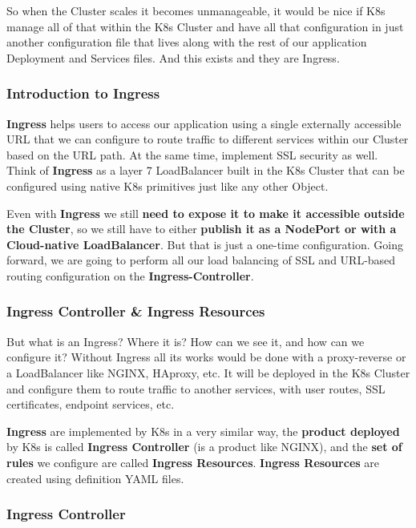\documentclass{article}
\begin{document}
So when the Cluster scales it becomes unmanageable, it would be nice if K8s manage all of that within the K8s Cluster and have all that configuration in just another configuration file that lives along with the rest  of our application Deployment and Services files. And this exists and they are Ingress.

\subsubsection{Introduction to Ingress}

\textbf{Ingress} helps users to access our application using a single externally accessible URL that we can configure to route traffic to different services within our Cluster based on the URL path. At the same time, implement SSL security as well. Think of \textbf{Ingress} as a layer 7 LoadBalancer built in the K8s Cluster that can be configured using native K8s primitives just like any other Object.

Even with \textbf{Ingress} we still \textbf{need to expose it to make it accessible outside the Cluster}, so we still have to either \textbf{publish it as a NodePort or with a Cloud-native LoadBalancer}. But that is just a one-time configuration. Going forward, we are going to perform all our load balancing of SSL and URL-based routing configuration on the \textbf{Ingress-Controller}.

\subsubsection{Ingress Controller \& Ingress Resources}

But what is an Ingress? Where it is? How can we see it, and how can we configure it? Without Ingress all its works would be done with a proxy-reverse or a LoadBalancer like NGINX, HAproxy, etc. It will be deployed in the K8s Cluster and configure them to route traffic to another services, with user routes, SSL certificates, endpoint services, etc.

\textbf{Ingress} are implemented by K8s in a very similar way, the \textbf{product deployed} by K8s is called \textbf{Ingress Controller} (is a product like NGINX), and the \textbf{set of rules} we configure are called \textbf{Ingress Resources}. \textbf{Ingress Resources} are created using definition YAML files. 

\subsubsection{Ingress Controller}
\end{document}
